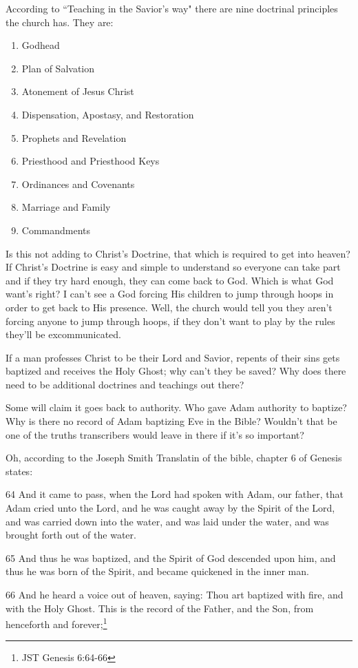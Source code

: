 According to ``Teaching in the Savior's way" there are nine doctrinal principles the
church has. They are:

\begin{enumerate}
  \item Godhead
  \item Plan of Salvation
  \item Atonement of Jesus Christ
  \item Dispensation, Apostasy, and Restoration
  \item Prophets and Revelation
  \item Priesthood and Priesthood Keys
  \item Ordinances and Covenants
  \item Marriage and Family
  \item Commandments
\end{enumerate}

Is this not adding to Christ's Doctrine, that which is required to get into heaven?
If Christ's Doctrine is easy and simple to understand so everyone can take part and
if they try hard enough, they can come back to God. Which is what God want's right? I
can't see a God forcing His children to jump through hoops in order to get back to
His presence. Well, the church would tell you they aren't forcing anyone to jump
through hoops, if they don't want to play by the rules they'll be excommunicated.

If a man professes Christ to be their Lord and Savior, repents of their sins gets 
baptized and receives the Holy Ghost; why can't they be saved? Why does there need to
be additional doctrines and teachings out there?

Some will claim it goes back to authority. Who gave Adam authority to baptize? Why is
there no record of Adam baptizing Eve in the Bible? Wouldn't that be one of the
truths transcribers would leave in there if it's so important?

Oh, according to the Joseph Smith Translatin of the bible, chapter 6 of Genesis
states:

\begin{displayquote}
64 And it came to pass, when the Lord had spoken with Adam, our father, that Adam 
cried unto the Lord, and he was caught away by the Spirit of the Lord, and was 
carried down into the water, and was laid under the water, and was brought forth 
out of the water.

65 And thus he was baptized, and the Spirit of God descended upon him, and thus he 
was born of the Spirit, and became quickened in the inner man.

66 And he heard a voice out of heaven, saying: Thou art baptized with fire, and with 
the Holy Ghost. This is the record of the Father, and the Son, 
from henceforth and forever;\footnote{JST Genesis 6:64-66}
\end{displayquote}

